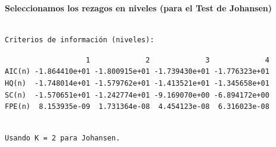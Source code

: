\documentclass[
  spanish,
  letterpaper,
  DIV=11,
  numbers=noendperiod]{scrartcl}
\newenvironment{Shaded}{\begin{snugshade}}{\end{snugshade}}
\newcommand{\AttributeTok}[1]{\textcolor[rgb]{0.40,0.45,0.13}{#1}}
\newcommand{\DecValTok}[1]{\textcolor[rgb]{0.68,0.00,0.00}{#1}}
\newcommand{\FunctionTok}[1]{\textcolor[rgb]{0.28,0.35,0.67}{#1}}
\newcommand{\NormalTok}[1]{\textcolor[rgb]{0.00,0.23,0.31}{#1}}
\newcommand{\OtherTok}[1]{\textcolor[rgb]{0.00,0.23,0.31}{#1}}
\newcommand{\SpecialCharTok}[1]{\textcolor[rgb]{0.37,0.37,0.37}{#1}}
\newcommand{\StringTok}[1]{\textcolor[rgb]{0.13,0.47,0.30}{#1}}
\begin{document}
\textbf{Seleccionamos los rezagos en niveles (para el Test de Johansen)}

\begin{Shaded}
\end{Shaded}

\begin{verbatim}

Criterios de información (niveles):
\end{verbatim}

\begin{verbatim}
                   1             2             3             4
AIC(n) -1.864410e+01 -1.800915e+01 -1.739430e+01 -1.776323e+01
HQ(n)  -1.748014e+01 -1.579762e+01 -1.413521e+01 -1.345658e+01
SC(n)  -1.570651e+01 -1.242774e+01 -9.169070e+00 -6.894172e+00
FPE(n)  8.153935e-09  1.731364e-08  4.454123e-08  6.316023e-08
\end{verbatim}

\begin{Shaded}
\end{Shaded}

\begin{verbatim}

Usando K = 2 para Johansen.
\end{verbatim}
\end{document}
